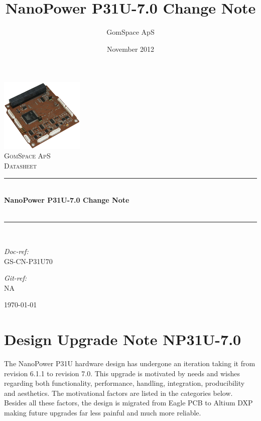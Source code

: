 \documentclass[9pt,a4paper]{article}
\title{NanoPower P31U-7.0 Change Note}
\author{GomSpace ApS}
\date{November 2012}
\begin{document}

\newcommand{\HRule}{\rule{\linewidth}{0.5mm}}
\begin{titlepage}
\begin{center}
\includegraphics[width=0.3\textwidth]{./img/board.png}\\[1cm]    
\textsc{\LARGE GomSpace ApS}\\[1.5cm]
\textsc{\Large Datasheet}\\[0.5cm]
\HRule \\[0.4cm]
{ \huge \bfseries NanoPower P31U-7.0 Change Note}\\[0.2cm]

\\
[0.2cm]
\HRule \\[1.5cm]
% 
\begin{minipage}{0.4\textwidth}
\begin{flushleft} \large
\emph{Doc-ref:} \\
GS-CN-P31U70
\end{flushleft}
\end{minipage}
\begin{minipage}{0.4\textwidth}
\begin{flushright} \large
\emph{Git-ref:} \\
NA 
\end{flushright}
\end{minipage}
\vfill
{\large \today}
\end{center}
\end{titlepage}



{
\hypersetup{linkcolor=black}
\newpage
\setcounter{tocdepth}{2}
\tableofcontents
}
\newpage
\section{Design Upgrade Note NP31U-7.0}

The NanoPower P31U hardware design has undergone an iteration taking it
from revision 6.1.1 to revision 7.0. This upgrade is motivated by needs
and wishes regarding both functionality, performance, handling,
integration, producibility and aesthetics. The motivational factors are
listed in the categories below. Besides all these factors, the design is
migrated from Eagle PCB to Altium DXP making future upgrades far less
painful and much more reliable.
\end{document}
